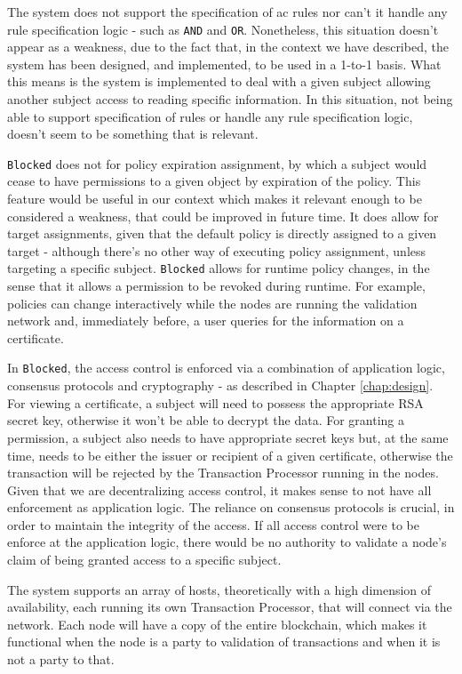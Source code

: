 The system does not support the specification of \gls{ac} rules nor can't it handle any rule specification logic - such as \texttt{AND} and \texttt{OR}. Nonetheless, this situation doesn't appear as a weakness, due to the fact that, in the context we have described, the system has been designed, and implemented, to be used in a 1-to-1 basis. What this means is the system is implemented to deal with a given subject allowing another subject access to reading specific information. In this situation, not being able to support specification of rules or handle any rule specification logic, doesn't seem to be something that is relevant.

\texttt{Blocked} does not for policy expiration assignment, by which a subject would cease to have permissions to a given object by expiration of the policy. This feature would be useful in our context which makes it relevant enough to be considered a weakness, that could be improved in future time. It does allow for target assignments, given that the default policy is directly assigned to a given target - although there's no other way of executing policy assignment, unless targeting a specific subject. \texttt{Blocked} allows for runtime policy changes, in the sense that it allows a permission to be revoked during runtime. For example, policies can change interactively while the nodes are running the validation network and, immediately before, a user queries for the information on a certificate.

In \texttt{Blocked}, the access control is enforced via a combination of application logic, consensus protocols and cryptography - as described in Chapter \ref{chap:design}. For viewing a certificate, a subject will need to possess the appropriate RSA secret key, otherwise it won't be able to decrypt the data. For granting a permission, a subject also needs to have appropriate secret keys but, at the same time, needs to be either the issuer or recipient of a given certificate, otherwise the transaction will be rejected by the Transaction Processor running in the nodes. Given that we are decentralizing access control, it makes sense to not have all enforcement as application logic. The reliance on consensus protocols is crucial, in order to maintain the integrity of the access. If all access control were to be enforce at the application logic, there would be no authority to validate a node's claim of being granted access to a specific subject.

The system supports an array of hosts, theoretically with a high dimension of availability, each running its own Transaction Processor, that will connect via the network. Each node will have a copy of the entire blockchain, which makes it functional when the node is a party to validation of transactions and when it is not a party to that.

